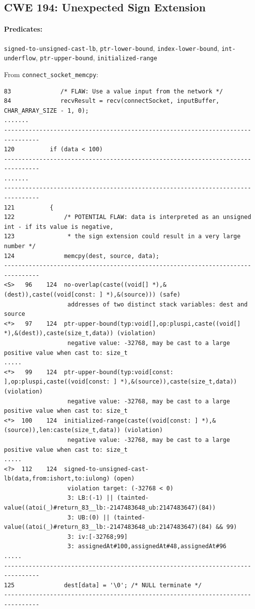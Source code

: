 \documentclass[11pt]{article}
\begin{document}
\subsection{CWE 194: Unexpected Sign Extension}

\paragraph{Predicates:} {\tt signed-to-unsigned-cast-lb}, {\tt ptr-lower-bound},
{\tt index-lower-bound}, {\tt int-underflow}, {\tt ptr-upper-bound},
{\tt initialized-range}


From {\tt connect\_socket\_memcpy}:
\begin{tiny}
\begin{verbatim}
83              /* FLAW: Use a value input from the network */
84              recvResult = recv(connectSocket, inputBuffer, CHAR_ARRAY_SIZE - 1, 0);
.......
--------------------------------------------------------------------------------
120          if (data < 100)
--------------------------------------------------------------------------------
.......
--------------------------------------------------------------------------------
121          {
122              /* POTENTIAL FLAW: data is interpreted as an unsigned int - if its value is negative,
123               * the sign extension could result in a very large number */
124              memcpy(dest, source, data);
--------------------------------------------------------------------------------
<S>   96    124  no-overlap(caste((void[] *),&(dest)),caste((void[const: ] *),&(source))) (safe)
                  addresses of two distinct stack variables: dest and source
<*>   97    124  ptr-upper-bound(typ:void[],op:pluspi,caste((void[] *),&(dest)),caste(size_t,data)) (violation)
                  negative value: -32768, may be cast to a large positive value when cast to: size_t
.....
<*>   99    124  ptr-upper-bound(typ:void[const: ],op:pluspi,caste((void[const: ] *),&(source)),caste(size_t,data)) (violation)
                  negative value: -32768, may be cast to a large positive value when cast to: size_t
<*>  100    124  initialized-range(caste((void[const: ] *),&(source)),len:caste(size_t,data)) (violation)
                  negative value: -32768, may be cast to a large positive value when cast to: size_t
.....
<?>  112    124  signed-to-unsigned-cast-lb(data,from:ishort,to:iulong) (open)
                  violation target: (-32768 < 0)
                  3: LB:(-1) || (tainted-value((atoi(_)#return_83__lb:-2147483648_ub:2147483647)(84))
                  3: UB:(0) || (tainted-value((atoi(_)#return_83__lb:-2147483648_ub:2147483647)(84) && 99)
                  3: iv:[-32768;99]
                  3: assignedAt#100,assignedAt#48,assignedAt#96
..... 
--------------------------------------------------------------------------------
125              dest[data] = '\0'; /* NULL terminate */
--------------------------------------------------------------------------------


\end{verbatim}
\end{tiny}
\end{document}

